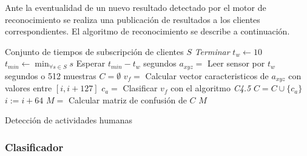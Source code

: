 Ante la eventualidad de un nuevo resultado detectado por el motor
de reconocimiento se realiza una publicación de resultados a los clientes
correspondientes. El algoritmo de reconocimiento se describe a continuación.

\begin{algorithm}[h]
\begin{algorithmic}[1]
    \Require Conjunto de tiempos de subscripción de clientes $S$
 			\State\textit{Terminar}
		\EndIf
		\State $t_w \leftarrow 10$
		\State $t_{min} \leftarrow \min_{\forall s \in S} s$
		\State Esperar $t_{min} - t_w$ segundos 
		\State $ a_{xyz} = $ Leer sensor por $t_w$ segundos o 512 muestras
		\State $ C = \emptyset$
			\State $ v_f = $ Calcular vector caracteristicos de $a_{xyz}$ con valores entre $[i, i + 127]$
			\State $ c_a = $ Clasificar $v_f$ con el algoritmo \textit{C4.5}
			\State $ C = C \cup \{c_a\}$ 
			\State $i := i + 64$
        \EndFor
        \State $ M = $ Calcular matriz de confusión de $C$ 
		\State
		\Return $ M $
	\EndProcedure
\end{algorithmic}

\caption{\label{alg5:reconocimiento}Detección de actividades humanas}
\end{algorithm}


\subsubsection{Clasificador}

